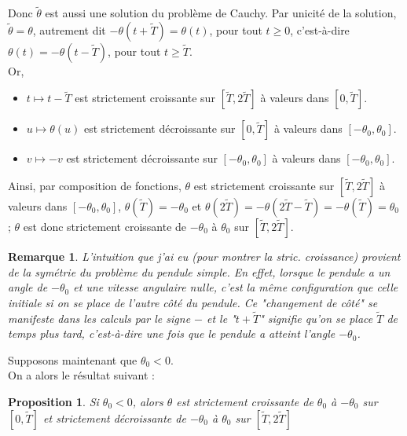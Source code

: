 \documentclass[9pt,a4paper]{article}
\newtheorem{prop}{Proposition}
\newtheorem{rem}{Remarque}
\begin{document}
\begin{itemize}[label=\textbullet]
    Donc $\tilde{\theta}$ est aussi une solution du problème de Cauchy. Par unicité de la solution, $\tilde{\theta} = \theta$, autrement dit $-\theta(t + \tilde{T}) = \theta(t)$, pour tout $t \geq 0$, c'est-à-dire $\theta(t) = -\theta(t - \tilde{T})$, pour tout $t \geq \tilde{T}$.\\
    Or,
    \begin{itemize}[label=\textbullet]
        \item $t \longmapsto t - \tilde{T}$ est strictement croissante sur $[\tilde{T}, 2\tilde{T}]$ à valeurs dans $[0, \tilde{T}]$.
        \item $u \longmapsto \theta(u)$ est strictement décroissante sur $[0, \tilde{T}]$ à valeurs dans $[-\theta_0, \theta_0]$.
        \item $v \longmapsto -v$ est strictement décroissante sur $[-\theta_0, \theta_0]$ à valeurs dans $[-\theta_0, \theta_0]$.
    \end{itemize}
    Ainsi, par composition de fonctions, $\theta$ est strictement croissante sur $[\tilde{T}, 2\tilde{T}]$ à valeurs dans $[-\theta_0, \theta_0]$, $\theta(\tilde{T}) = -\theta_0$ et $\theta(2\tilde{T}) = -\theta(2\tilde{T} - \tilde{T}) = -\theta(\tilde{T}) = \theta_0$ ; $\theta$ est donc strictement croissante de $-\theta_0$ à $\theta_0$ sur $[\tilde{T}, 2\tilde{T}]$.
\end{itemize}
\begin{tcolorbox}
    \begin{rem}
        L'intuition que j'ai eu (pour montrer la stric. croissance) provient de la symétrie du problème du pendule simple. En effet, lorsque le pendule a un angle de $-\theta_0$ et une vitesse angulaire nulle, c'est la même configuration que celle initiale si on se place de l'autre côté du pendule. Ce "changement de côté" se manifeste dans les calculs par le signe $-$ et le "$t + \tilde{T}$" signifie qu'on se place $\tilde{T}$ de temps plus tard, c'est-à-dire une fois que le pendule a atteint l'angle $-\theta_0$.
    \end{rem}
\end{tcolorbox}
Supposons maintenant que $\theta_0 < 0$.\\
On a alors le résultat suivant :
\begin{tcolorbox}[colback=green!5!white, colframe=green!50!black]
    \begin{prop}
        Si $\theta_0 < 0$, alors $\theta$ est strictement croissante de $\theta_0$ à $-\theta_0$ sur $[0, \tilde{T}]$ et strictement décroissante de $-\theta_0$ à $\theta_0$ sur $[\tilde{T}, 2\tilde{T}]$
    \end{prop}
\end{tcolorbox}
\end{document}
